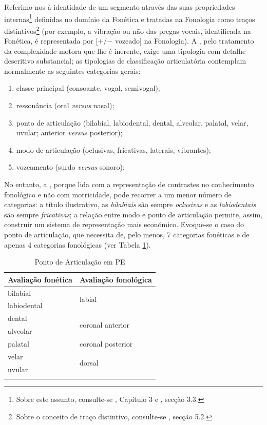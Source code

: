 \documentclass[output=paper]{LSP/langsci}
\begin{document}
Referimo-nos à identidade de um segmento através das suas propriedades internas\footnote{Sobre este assunto, consulte-se \citet{mateus_etal2005}, Capítulo 3 e \citet{freitas_etal2012}, secção 3.3.} definidas no domínio da Fonética e tratadas na Fonologia como traços distintivos\footnote{Sobre o conceito de traço distintivo, consulte-se \citet{mateus_etal2005}, secção 5.2.} (por exemplo, a vibração ou não das pregas vocais, identificada na Fonética, é representada por [$+$/$-$ vozeado] na Fonologia).  A \textit{}, pelo tratamento da complexidade motora que lhe é inerente, exige uma tipologia com detalhe descritivo substancial; as tipologias de classificação articulatória contemplam normalmente as seguintes categorias gerais:
\begin{enumerate}[label=(\roman*)]
\item classe principal (consoante, vogal, semivogal);
\item ressonância (oral \textit{versus} nasal);
\item ponto de articulação (bilabial, labiodental, dental, alveolar, palatal, velar, uvular; anterior \textit{versus} posterior);
\item modo de articulação (oclusivas, fricativas, laterais, vibrantes);
\item vozeamento (surdo \textit{versus} sonoro);
\end{enumerate}

No entanto, a \textit{}, porque lida com a representação de contrastes no conhecimento fonológico e não com motricidade, pode recorrer a um menor número de categorias: a título ilustrativo, as \textit{bilabiais} são sempre \textit{oclusivas} e as \textit{labiodentais} são sempre \textit{fricativas}; a relação entre modo e ponto de articulação permite, assim, construir um sistema de representação mais económico. Evoque-se o caso do ponto de articulação, que necessita de, pelo menos, 7 categorias fonéticas e de apenas 4 categorias fonológicas (ver Tabela \ref{tab:lousada_1}).

\begin{table}
\caption{Ponto de Articulação em PE}
\begin{tabular}{ll}
\lsptoprule
Avaliação fonética & Avaliação fonológica              \\
\midrule
bilabial           & \multirow{2}{*}{labial}           \\
labiodental        &                                   \\
\midrule
dental             & \multirow{2}{*}{coronal anterior} \\
alveolar           &                                   \\
palatal            & coronal posterior                 \\
\midrule
velar              & \multirow{2}{*}{dorsal}           \\
uvular             &                    \\
\lspbottomrule
\end{tabular}
\label{tab:lousada_1}
\end{table}
\end{document}

